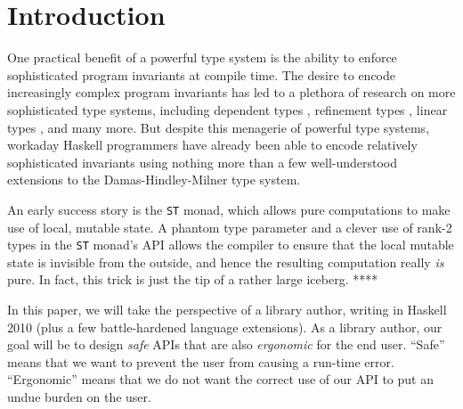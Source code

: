 \documentclass[format=sigplan, review=false, screen=true]{acmart}
\begin{document}
%
%



\maketitle

\renewcommand{\shortauthors}{M. Noonan}

%

\section{Introduction}

One practical benefit of a powerful type
system is the ability to enforce sophisticated program
invariants at compile time. The desire to encode increasingly
complex program invariants has led to a plethora of research
on more sophisticated type systems, including dependent types \cite{augustsson1998cayenne,bove2009dependent}, refinement types \cite{freeman1991refinement}, linear
types \cite{wadler1990linear}, and many more. But despite this menagerie of powerful
type systems, workaday Haskell programmers have already been able to encode
relatively sophisticated invariants using nothing more than a
few well-understood extensions to the Damas-Hindley-Milner type system.

An early success story is the \texttt{ST} monad, which allows pure
computations to make use of local, mutable state. A phantom type parameter
and a clever use of rank-2 types in the \texttt{ST} monad's API allows the
compiler to ensure that the local mutable state is invisible from the outside,
and hence the resulting computation really \emph{is} pure. In fact, this
trick is just the tip of a rather large iceberg. ****

In this paper, we will take the perspective of a library author, writing in
Haskell 2010 (plus a few battle-hardened language extensions). As a library
author, our goal will be to design \emph{safe} APIs that are also \emph{ergonomic}
for the end user. ``Safe'' means that we want to prevent the user from causing a
run-time error. ``Ergonomic'' means that we do not want the correct use of our
API to put an undue burden on the user.
\end{document}
